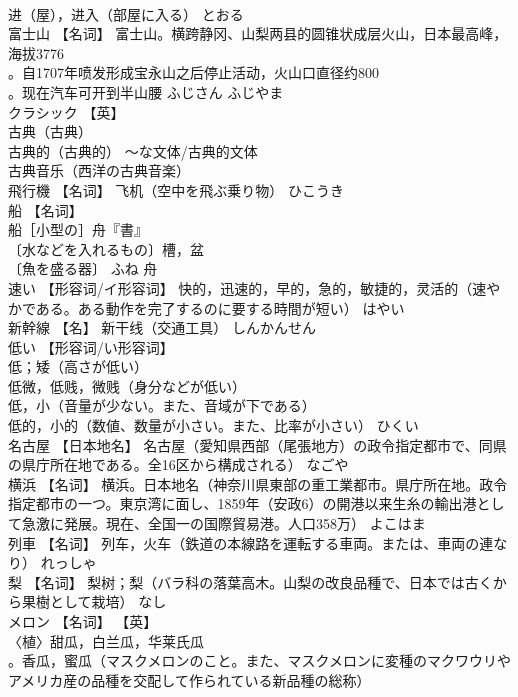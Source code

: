 \documentclass[8pt]{extreport}
\begin{document}
\begin{CJK}{UTF8}{min}
\\	进（屋），进入（部屋に入る）	とおる	
\\	富士山	【名词】 富士山。横跨静冈、山梨两县的圆锥状成层火山，日本最高峰，海拔3776
\\	。自1707年喷发形成宝永山之后停止活动，火山口直径约800
\\	。现在汽车可开到半山腰	ふじさん ふじやま	
\\	クラシック	【英】
\\	古典（古典） 
\\	古典的（古典的） 〜な文体/古典的文体 
\\	古典音乐（西洋の古典音楽）		
\\	飛行機	【名词】 飞机（空中を飛ぶ乗り物）	ひこうき	
\\	船	【名词】 
\\	船［小型の］舟『書』 
\\	〔水などを入れるもの〕槽，盆 
\\	〔魚を盛る器〕	ふね	舟
\\	速い	【形容词/イ形容词】 快的，迅速的，早的，急的，敏捷的，灵活的（速やかである。ある動作を完了するのに要する時間が短い）	はやい	
\\	新幹線	【名】 新干线（交通工具）	しんかんせん	
\\	低い	【形容词/い形容词】 
\\	低；矮（高さが低い） 
\\	低微，低贱，微贱（身分などが低い） 
\\	低，小（音量が少ない。また、音域が下である） 
\\	低的，小的（数値、数量が小さい。また、比率が小さい）	ひくい	
\\	名古屋	【日本地名】 名古屋（愛知県西部（尾張地方）の政令指定都市で、同県の県庁所在地である。全16区から構成される）	なごや	
\\	横浜	【名词】 横浜。日本地名（神奈川県東部の重工業都市。県庁所在地。政令指定都市の一つ。東京湾に面し、1859年（安政6）の開港以来生糸の輸出港として急激に発展。現在、全国一の国際貿易港。人口358万）	よこはま	
\\	列車	【名词】 列车，火车（鉄道の本線路を運転する車両。または、車両の連なり）	れっしゃ	
\\	梨	【名词】 梨树；梨（バラ科の落葉高木。山梨の改良品種で、日本では古くから果樹として栽培）	なし	
\\	メロン	【名词】 【英】
\\	〈植〉甜瓜，白兰瓜，华莱氏瓜
\\	。香瓜，蜜瓜（マスクメロンのこと。また、マスクメロンに変種のマクワウリやアメリカ産の品種を交配して作られている新品種の総称）		

\end{CJK}
\end{document}
